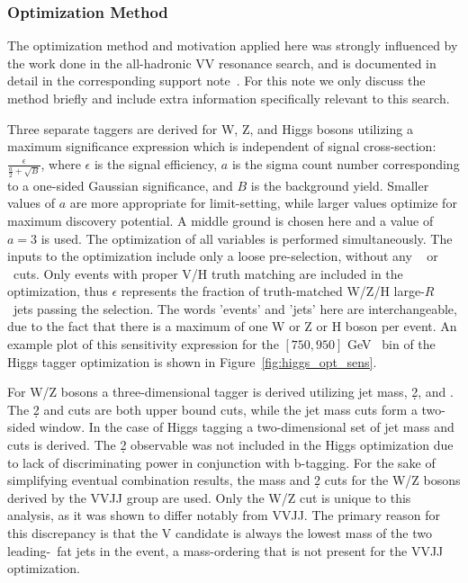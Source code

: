 \subsubsection{Optimization Method}
\label{subsec:tagger_opt}
The optimization method and motivation applied here was strongly influenced by the work done in the all-hadronic VV resonance search, and is documented in detail in the corresponding support note~\cite{VVJJSupport2019}.
For this note we only discuss the method briefly and include extra information specifically relevant to this search.

Three separate taggers are derived for W, Z, and Higgs bosons utilizing a maximum significance expression \cite{punzi2003sensitivity} which is independent of signal cross-section: $\frac{\epsilon}{\frac{a}{2}+\sqrt{B}}$, where $\epsilon$ is the signal efficiency, $a$ is the sigma count number corresponding to a one-sided Gaussian significance, and $B$ is the background yield.
Smaller values of $a$ are more appropriate for limit-setting, while larger values optimize for maximum discovery potential.
A middle ground is chosen here and a value of $a = 3$ is used.
The optimization of all variables is performed simultaneously.
The inputs to the optimization include only a loose pre-selection, without any ~ or ~\mvh cuts.
Only events with proper V/H truth matching are included in the optimization, thus $\epsilon$ represents the fraction of truth-matched W/Z/H large-$R$ ~jets passing the selection.
The words 'events' and 'jets' here are interchangeable, due to the fact that there is a maximum of one W or Z or H boson per event.
An example plot of this sensitivity expression for the $[750,950]$ GeV \pt\ bin of the Higgs tagger optimization is shown in Figure~\ref{fig:higgs_opt_sens}.


For W/Z bosons a three-dimensional tagger is derived utilizing jet mass, \d2, and \ntrk.
The \d2 and \ntrk cuts are both upper bound cuts, while the jet mass cuts form a two-sided window.
In the case of Higgs tagging a two-dimensional set of jet mass and \ntrk cuts is derived.
The \d2 observable was not included in the Higgs optimization due to lack of discriminating power in conjunction with b-tagging.
For the sake of simplifying eventual combination results, the mass and \d2 cuts for the W/Z bosons derived by the VVJJ group are used.
Only the W/Z \ntrk cut is unique to this analysis, as it was shown to differ notably from VVJJ.
The primary reason for this discrepancy is that the V candidate is always the lowest mass of the two leading-\pt\ fat jets in the event, a mass-ordering that is not present for the VVJJ optimization.

